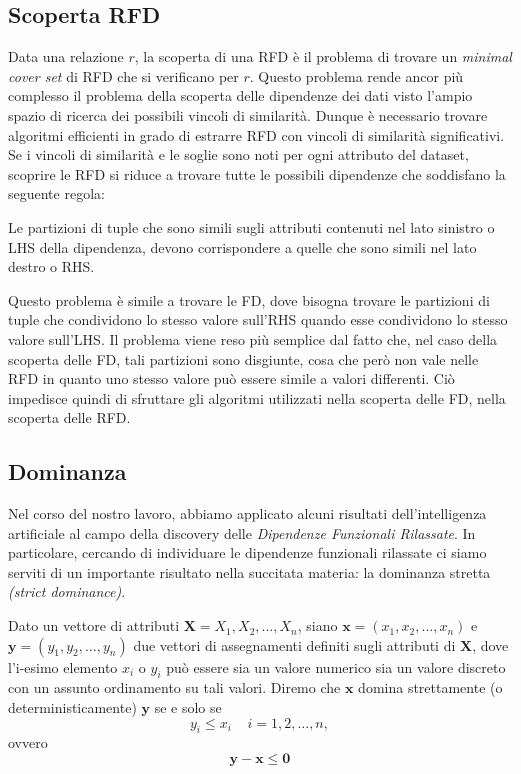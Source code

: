 \subsection{Scoperta RFD}
Data una relazione $r$, la scoperta di una RFD è il problema di trovare un \textit{minimal cover set} di RFD che si verificano per $r$. Questo problema rende ancor più complesso il problema della scoperta delle dipendenze dei dati visto l'ampio spazio di ricerca dei possibili vincoli di similarità. Dunque è necessario trovare algoritmi efficienti in grado di estrarre RFD con vincoli di similarità significativi.\\
Se i vincoli di similarità e le soglie sono noti per ogni attributo del dataset, scoprire le RFD si riduce a trovare tutte le possibili dipendenze che soddisfano la seguente regola:
\begin{lemma}
	Le partizioni di tuple che sono simili sugli attributi contenuti nel lato sinistro o LHS della dipendenza, devono corrispondere a quelle che sono simili nel lato destro o RHS.
\end{lemma}
Questo problema è simile a trovare le FD, dove bisogna trovare le partizioni di tuple che condividono lo stesso valore sull'RHS quando esse condividono lo stesso valore sull'LHS. Il problema viene reso più semplice dal fatto che, nel caso della scoperta delle FD, tali partizioni sono disgiunte, cosa che però non vale nelle RFD in quanto uno stesso valore può essere simile a valori differenti. Ciò impedisce quindi di sfruttare gli algoritmi utilizzati nella scoperta delle FD, nella scoperta delle RFD.
\subsection{Dominanza}
Nel corso del nostro lavoro, abbiamo applicato alcuni risultati dell'intelligenza artificiale al campo della discovery delle \textit{Dipendenze Funzionali Rilassate}. In particolare, cercando di individuare le dipendenze funzionali rilassate ci siamo serviti di un importante risultato nella succitata materia: la dominanza stretta \textit{(strict dominance)}.
\begin{theorem}
	\label{defDom}
	Dato un vettore di attributi $\mathbf{X} = X_1, X_2, \ldots, X_n $, siano $\mathbf{x} = (x_1, x_2, \ldots, x_n)$ e $\mathbf{y} = (y_1, y_2, \ldots , y_n)$ due vettori di assegnamenti definiti sugli attributi di $\mathbf{X}$, dove l'i-esimo elemento $x_i$ o $y_i$ può essere sia un valore numerico sia un valore discreto con un assunto ordinamento su tali valori. Diremo che $\mathbf{x}$ domina strettamente (o deterministicamente) $\mathbf{y}$ se e solo se $$y_i \leq x_i\;\;\;\;i = 1,2,\ldots,n,$$ ovvero $$\mathbf{y} - \mathbf{x} \leq \mathbf{0}$$
\end{theorem}
